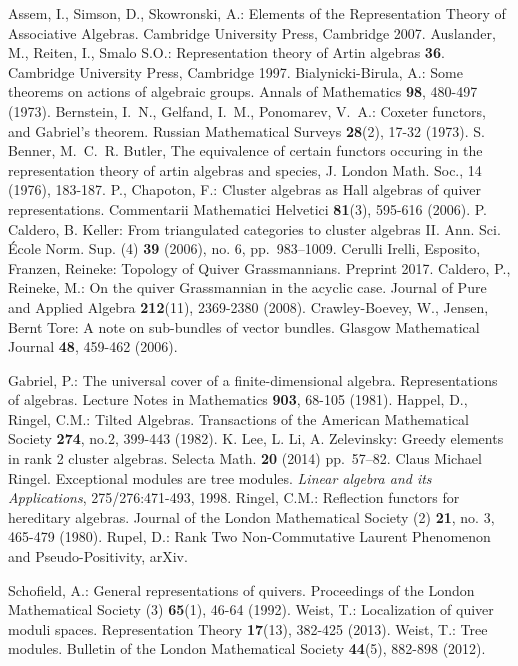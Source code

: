 \documentclass{amsart}
\numberwithin{equation}{section}
\begin{document}
\begin{thebibliography}{10}
Assem, I., Simson, D., Skowronski, A.: Elements of the Representation Theory of Associative Algebras. Cambridge University Press, Cambridge 2007.
 Auslander, M., Reiten, I., Smalo S.O.: Representation theory of Artin algebras {\bf 36}. Cambridge University Press, Cambridge 1997.
 Bialynicki-Birula, A.: Some theorems on actions of algebraic groups. Annals of Mathematics \textbf{98}, 480-497 (1973).
Bernstein, I.~N., Gelfand, I.~M., Ponomarev, V.~A.: Coxeter functors, and Gabriel's theorem. Russian Mathematical Surveys \textbf{28}(2), 17-32 (1973).
 S. Benner, M.~C.~R. Butler, The equivalence of certain functors occuring in the representation theory of artin algebras and species, J. London Math. Soc., 14 (1976), 183-187.
 P., Chapoton, F.: Cluster algebras as {H}all algebras of quiver representations.
Commentarii Mathematici Helvetici \textbf{81}(3), 595-616 (2006).
  P. Caldero, B. Keller: From triangulated categories to cluster algebras II.  Ann. Sci. \'Ecole Norm. Sup. (4) \textbf{39} (2006), no. 6, pp.~983--1009.
 Cerulli Irelli, Esposito, Franzen, Reineke: Topology of Quiver Grassmannians. Preprint 2017.
Caldero, P., Reineke, M.: On the quiver Grassmannian in the acyclic case.
Journal of Pure and Applied Algebra \textbf{212}(11), 2369-2380 (2008).
 Crawley-Boevey, W., Jensen, Bernt Tore: A note on sub-bundles of vector bundles. Glasgow Mathematical Journal \textbf{48}, 459-462 (2006).

 Gabriel, P.: The universal cover of a finite-dimensional algebra. Representations of algebras. Lecture Notes in Mathematics {\bf 903}, 68-105 (1981).
 Happel, D., Ringel, C.M.: Tilted Algebras. Transactions of the American Mathematical Society {\bf 274}, no.2, 399-443 (1982).
 K. Lee, L. Li, A. Zelevinsky: Greedy elements in rank 2 cluster algebras. Selecta Math. \textbf{20} (2014) pp.~57--82.
 Claus Michael Ringel. Exceptional modules are tree modules. \textit{Linear algebra and its Applications}, 275/276:471-493, 1998.
 Ringel, C.M.: Reflection functors for hereditary algebras. Journal of the London Mathematical Society (2) {\bf 21}, no. 3, 465-479 (1980).
 Rupel, D.: Rank Two Non-Commutative Laurent Phenomenon and Pseudo-Positivity, arXiv.

 Schofield, A.: General representations of quivers. Proceedings of the London Mathematical Society (3) \textbf{65}(1), 46-64 (1992).
	 Weist, T.: Localization of quiver moduli spaces. Representation Theory \textbf{17}(13), 382-425 (2013).
	 Weist, T.: Tree modules. Bulletin of the London Mathematical Society \textbf{44}(5), 882-898 (2012).
\end{thebibliography}
\end{document}

